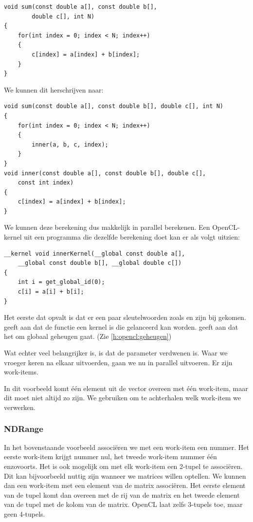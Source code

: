 \begin{lstlisting}
void sum(const double a[], const double b[],
        double c[], int N)
{
    for(int index = 0; index < N; index++)
    {
        c[index] = a[index] + b[index];
    }
}
\end{lstlisting}
We kunnen dit herschrijven naar:
\begin{lstlisting}
void sum(const double a[], const double b[], double c[], int N)
{
    for(int index = 0; index < N; index++)
    {
        inner(a, b, c, index);
    }
}
void inner(const double a[], const double b[], double c[],
    const int index)
{
    c[index] = a[index] + b[index];
}
\end{lstlisting}
We kunnen deze berekening dus makkelijk in parallel berekenen.
Een OpenCL-kernel uit een programma die dezelfde berekening doet kan er als volgt uitzien:
\begin{lstlisting}
__kernel void innerKernel(__global const double a[],
    __global const double b[], __global double c[])
{
    int i = get_global_id(0);
    c[i] = a[i] + b[i];
}
\end{lstlisting}
Het eerste dat opvalt is dat er een paar sleutelwoorden zoals  en  zijn bij gekomen.  geeft aan dat de functie een kernel is die gelanceerd kan worden.  geeft aan dat het om globaal geheugen gaat. (Zie \ref{h:opencl:geheugen})

Wat echter veel belangrijker is, is dat de parameter  verdwenen is. Waar we vroeger   keren na elkaar uitvoerden, gaan we nu  %
in parallel uitvoeren. Er zijn  work-items. 

In dit voorbeeld komt \'e\'en element uit de vector overeen met \'e\'en work-item, maar dit moet niet altijd zo zijn. We gebruiken  om te achterhalen welk work-item we verwerken.

\subsubsection{NDRange}
In het bovenstaande voorbeeld associ\"eren we met een work-item een nummer. Het eerste work-item krijgt nummer nul, het tweede work-item nummer \'e\'en enzovoorts. Het is ook mogelijk om met elk work-item een 2-tupel te associ\"eren. Dit kan bijvoorbeeld nuttig zijn wanneer we matrices willen optellen. We kunnen dan een work-item met een element van de matrix associ\"eren. Het eerste element van de tupel komt dan overeen met de rij van de matrix en het tweede element van de tupel met de kolom van de matrix. OpenCL laat zelfs 3-tupels toe, maar geen 4-tupels.


